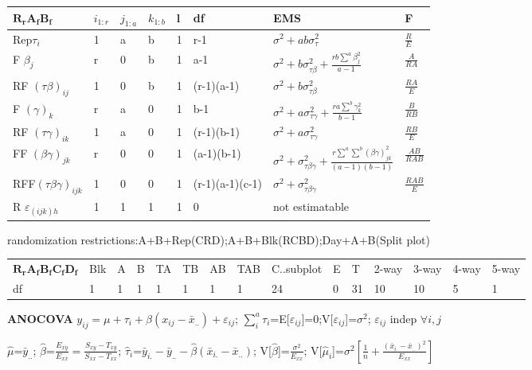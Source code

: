 \documentclass[
  10pt,
  twocolumn]{article}
\begin{document}
\begin{tabular}{ l|l|l|l|l|l|l|l }\hline
$\mathbf{R_rA_fB_f}$& $i_{1:r}$ & $j_{1:a}$ & $k_{1:b}$ & l & df &  EMS & F\\\hline
Rep$\tau_{i}$&1&a&b&1&r-1&$\sigma^2+ab\sigma^2_{\tau}$&$\frac{R}{E}$\\
F $\beta_{j}$ &r&0&b&1&a-1&$\sigma^2+b\sigma^2_{\tau\beta}+\frac{rb\sum^{a}\beta_j^2}{a-1}$&$\frac{A}{RA}$\\
RF $(\tau\beta)_{ij}$&1&0&b&1&(r-1)(a-1)&$\sigma^2+b\sigma^2_{\tau\beta}$&$\frac{RA}{E}$\\
F $(\gamma)_{k}$ &r&a&0&1&b-1&$\sigma^2+a\sigma^2_{\tau\gamma}+\frac{ra\sum^{b}\gamma_k^2}{b-1}$&$\frac{B}{RB}$\\
RF $(\tau\gamma)_{ik}$&1&a&0&1&(r-1)(b-1)&$\sigma^2+a\sigma^2_{\tau\gamma}$&$\frac{RB}{E}$\\
FF $(\beta\gamma)_{jk}$&r&0&0&1&(a-1)(b-1)&$\sigma^2+\sigma^2_{\tau\beta\gamma}+\frac{r\sum^{a}\sum^{b}(\beta\gamma)_{jk}^2}{(a-1)(b-1)}$&$\frac{AB}{RAB}$\\
RFF$(\tau\beta\gamma)_{ijk}$&1&0&0&1&(r-1)(a-1)(c-1)&$\sigma^2+\sigma^2_{\tau\beta\gamma}$&$\frac{RAB}{E}$\\
R $\varepsilon_{(ijk)h}$ &1&1&1&1&0&not estimatable\\\hline
\end{tabular}

randomization restrictions:A+B+Rep(CRD);A+B+Blk(RCBD);Day+A+B(Split
plot)

\begin{tabular}{ l|l|l|l|l|l|l|l|l|l|l||l|l|l|l }
$\mathbf{R_rA_fB_fC_fD_f}$&Blk & A & B & TA & TB & AB & TAB & C..subplot & E & T& 2-way&3-way&4-way&5-way\\
df& 1 & 1 & 1 & 1 & 1 & 1 & 1 & 24 & 0 & 31 & 10 & 10 & 5 & 1 \\\hline
\end{tabular}

\hrulefill

\textbf{ANOCOVA}
\(y_{ij}=\mu+\tau_i+\beta(x_{ij}-\bar x_{..})+\varepsilon_{ij}\);
\(\sum_{i}^a\tau_{i}\)=E{[}\(\varepsilon_{ij}\){]}=0;V{[}\(\varepsilon_{ij}\){]}=\(\sigma^2\);
\(\varepsilon_{ij}\) indep \(\forall i,j\)

\(\hat\mu\)=\(\bar y_{..}\);
\(\hat\beta\)=\(\frac{E_{xy}}{E_{xx}}=\frac{S_{xy}-T_{xy}}{S_{xx}-T_{xx}}\);
\(\hat\tau_{i}\)=\(\bar y_{i.}-\bar y_{..}-\hat\beta(\bar x_{i.}-\bar x_{..})\);
V{[}\(\hat\beta\){]}=\(\frac{\sigma^2}{E_{xx}}\);
V{[}\(\hat\mu_i\){]}=\(\sigma^2[\frac1n+\frac{(\bar x_{i.}-\bar x_{..})^2}{E_{xx}}]\)
\end{document}
